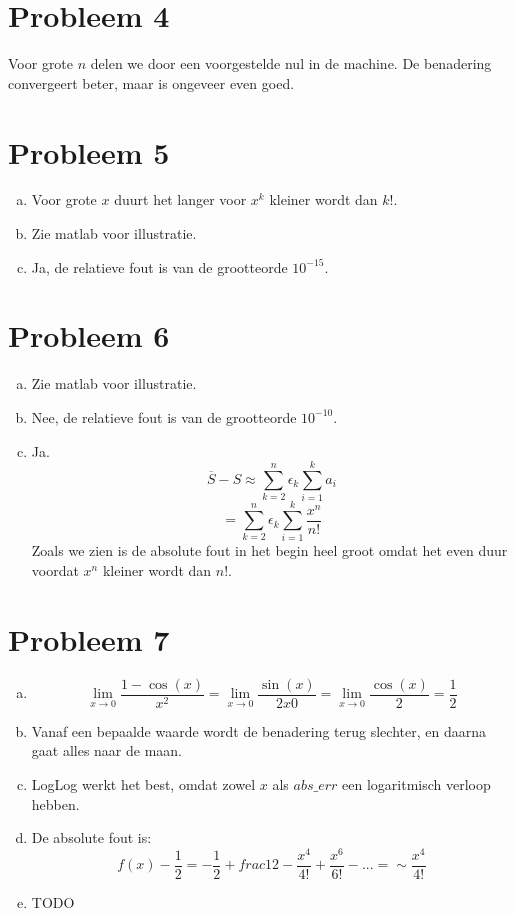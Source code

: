 \documentclass[12pt,a4paper]{article}
\begin{document}
\section{Probleem 4}
Voor grote $n$ delen we door een voorgestelde nul in de machine.
De benadering convergeert beter, maar is ongeveer even goed.
\section{Probleem 5}
\begin{enumerate}[(a)]
\item Voor grote $x$ duurt het langer voor $x^k$ kleiner wordt dan $k!$.
\item Zie matlab voor illustratie.
\item Ja, de relatieve fout is van de grootteorde $10^{-15}$.
\end{enumerate}

\section{Probleem 6}
\begin{enumerate}[(a)]
\item Zie matlab voor illustratie.
\item Nee, de relatieve fout is van de grootteorde $10^{-10}$.
\item Ja.
\[
\overline{S}-S \approx \sum_{k=2}^n\epsilon_k\sum_{i=1}^ka_i
\]
\[
= \sum_{k=2}^n\epsilon_k\sum_{i=1}^k \frac{x^n}{n!}
\]
Zoals we zien is de absolute fout in het begin heel groot omdat het even duur voordat $x^n$ kleiner wordt dan $n!$.
\end{enumerate}


\section{Probleem 7}
\begin{enumerate}[(a)]
\item
\[
\lim_{x \rightarrow 0} \frac{1-\cos(x)}{x^2}
= \lim_{x \rightarrow 0} \frac{\sin(x)}{2x0}
= \lim_{x \rightarrow 0} \frac{\cos(x)}{2}
= \frac{1}{2}
\]

\item
Vanaf een bepaalde waarde wordt de benadering terug slechter, en daarna gaat alles naar de maan.

\item
LogLog werkt het best, omdat zowel $x$ als $abs\_err$ een logaritmisch verloop hebben.

\item
De absolute fout is:
\[
f(x)-\frac{1}{2} = -\frac{1}{2} + frac{1}{2} - \frac{x^4}{4!} + \frac{x^6}{6!} -... = \sim\frac{x^4}{4!}
\]

\item
TODO

\end{enumerate}
\end{document}
